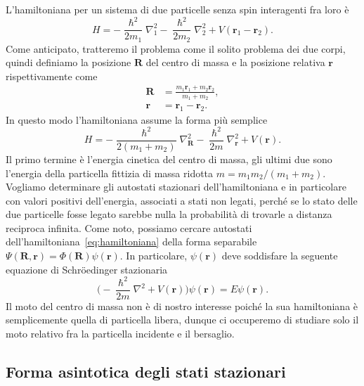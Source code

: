 \documentclass[a4paper,fleqn,twoside,12pt]{article}
\begin{document}
L'hamiltoniana per un sistema di due particelle senza spin interagenti fra loro
è
\begin{equation}
  H = -\frac{\hslash^{2}}{2m_{1}} \nabla_{1}^{2}
  -\frac{\hslash^{2}}{2m_{2}}\nabla_{2}^{2} + V(\bm{r}_{1} - \bm{r}_{2}).
\end{equation}
Come anticipato, tratteremo il problema come il solito problema dei due corpi,
quindi definiamo la posizione $\bm{R}$ del centro di massa e la posizione
relativa $\bm{r}$ rispettivamente come
\begin{subequations}
  \begin{align}
    \bm{R} &= \frac{m_{1}\bm{r}_{1} + m_{2}\bm{r}_{2}}{m_{1} + m_{2}}, \\
    \bm{r} &= \bm{r}_{1} - \bm{r}_{2}.
  \end{align}
\end{subequations}
In questo modo l'hamiltoniana assume la forma più semplice
\begin{equation}
  \label{eq:hamiltoniana}
  H = -\frac{\hslash^{2}}{2(m_{1} + m_{2})}\nabla_{\bm{R}}^{2} -
  \frac{\hslash^{2}}{2m}\nabla_{\bm{r}}^{2} + V(\bm{r}).
\end{equation}
Il primo termine è l'energia cinetica del centro di massa, gli ultimi due sono
l'energia della particella fittizia di massa ridotta
$m = m_{1}m_{2}/(m_{1}+m_{2})$.  Vogliamo determinare gli autostati stazionari
dell'hamiltoniana e in particolare con valori positivi dell'energia, associati a
stati non legati, perché se lo stato delle due particelle fosse legato sarebbe
nulla la probabilità di trovarle a distanza reciproca infinita.  Come noto,
possiamo cercare autostati dell'hamiltoniana~\eqref{eq:hamiltoniana} della forma
separabile $\Psi(\bm{R}, \bm{r}) = \Phi(\bm{R})\psi(\bm{r})$.  In particolare,
$\psi(\bm{r})$ deve soddisfare la seguente equazione di Schröedinger stazionaria
\begin{equation}
  \label{eq:schroedinger-stazionaria}
  \bigg(-\frac{\hslash^{2}}{2m}\nabla^{2} + V(\bm{r})\bigg)\psi(\bm{r}) =
  E\psi(\bm{r}).
\end{equation}
Il moto del centro di massa non è di nostro interesse poiché la sua hamiltoniana
è semplicemente quella di particella libera, dunque ci occuperemo di studiare
solo il moto relativo fra la particella incidente e il bersaglio.

\subsection{Forma asintotica degli stati stazionari}
\label{sec:forma-asintintotica}
\end{document}
